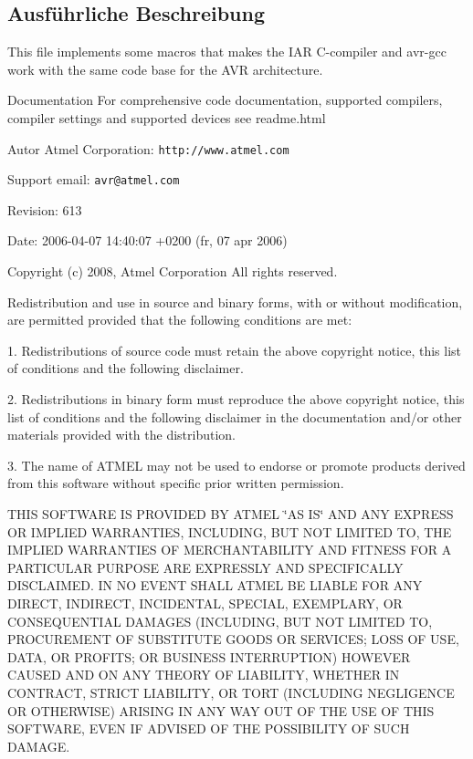 \subsection{Ausführliche Beschreibung}
This file implements some macros that makes the IAR C-\/compiler and avr-\/gcc work with the same code base for the AVR architecture. \begin{DoxyParagraph}{Documentation}
For comprehensive code documentation, supported compilers, compiler settings and supported devices see readme.html
\end{DoxyParagraph}
\begin{DoxyAuthor}{Autor}
Atmel Corporation: {\tt http://www.atmel.com} \par
 Support email: {\tt avr@atmel.com}
\end{DoxyAuthor}
\begin{DoxyParagraph}{Revision:}
613 
\end{DoxyParagraph}
\begin{DoxyParagraph}{Date:}
2006-\/04-\/07 14:40:07 +0200 (fr, 07 apr 2006) 
\end{DoxyParagraph}
\par


Copyright (c) 2008, Atmel Corporation All rights reserved.

Redistribution and use in source and binary forms, with or without modification, are permitted provided that the following conditions are met:

1. Redistributions of source code must retain the above copyright notice, this list of conditions and the following disclaimer.

2. Redistributions in binary form must reproduce the above copyright notice, this list of conditions and the following disclaimer in the documentation and/or other materials provided with the distribution.

3. The name of ATMEL may not be used to endorse or promote products derived from this software without specific prior written permission.

THIS SOFTWARE IS PROVIDED BY ATMEL \char`\"{}AS IS\char`\"{} AND ANY EXPRESS OR IMPLIED WARRANTIES, INCLUDING, BUT NOT LIMITED TO, THE IMPLIED WARRANTIES OF MERCHANTABILITY AND FITNESS FOR A PARTICULAR PURPOSE ARE EXPRESSLY AND SPECIFICALLY DISCLAIMED. IN NO EVENT SHALL ATMEL BE LIABLE FOR ANY DIRECT, INDIRECT, INCIDENTAL, SPECIAL, EXEMPLARY, OR CONSEQUENTIAL DAMAGES (INCLUDING, BUT NOT LIMITED TO, PROCUREMENT OF SUBSTITUTE GOODS OR SERVICES; LOSS OF USE, DATA, OR PROFITS; OR BUSINESS INTERRUPTION) HOWEVER CAUSED AND ON ANY THEORY OF LIABILITY, WHETHER IN CONTRACT, STRICT LIABILITY, OR TORT (INCLUDING NEGLIGENCE OR OTHERWISE) ARISING IN ANY WAY OUT OF THE USE OF THIS SOFTWARE, EVEN IF ADVISED OF THE POSSIBILITY OF SUCH DAMAGE. 

